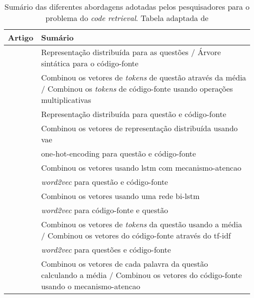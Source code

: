 \begin{table}[h]
\centering
\begin{tabular}{  p{5cm}  p{10cm}   }
\hline
\textbf{Artigo} & \textbf{Sumário} \\
\hline
\multirow{2}{8em}{\cite{Allamanis-bimodal-source-code-natural-language:2015}} & Representação distribuída para as questões / Árvore sintática para o código-fonte\\

& Combinou os vetores de \textit{tokens} de questão através da média / Combinou os \textit{tokens} de código-fonte usando operações multiplicativas\\

\hline
 
\multirow{2}{8em}{\cite{Chen-bi-variational-autoencoder:2018}} & Representação distribuída para questão e código-fonte\\

& Combinou os vetores de representação distribuída usando \acrshort{vae}\\

 \hline
\multirow{2}{8em}{\cite{iyer-etal-2016-summarizing}} & \gls{one-hot-encoding} para questão e código-fonte \\
 
 & Combinou os vetores usando \acrshort{lstm} com \gls{mecanismo-atencao}\\
 
 \hline
 
 \multirow{2}{8em}{\cite{Gu-deep-code-search:2018}} & \textit{word2vec} para questão e código-fonte\\
 
 & Combinou os vetores usando uma rede bi-\acrshort{lstm}\\
 
 \hline
 
 \multirow{2}{8em}{\citep{Sachdev-neural-code-search:2018}} & \textit{word2vec} para código-fonte e questão\\
 
 & Combinou os vetores de \textit{tokens} da questão usando a média / Combinou os vetores do código-fonte através do \acrshort{tf-idf} \\
 
 \hline
 
 \multirow{2}{8em}{\cite{cambronero-deep-learning-code-search:2019}} & \textit{word2vec} para questões e código-fonte \\
 
 & Combinou os vetores de cada palavra da questão calculando a média / Combinou os vetores do código-fonte usando o \gls{mecanismo-atencao}\\
 
 \hline
 
\end{tabular}
\caption{Sumário das diferentes abordagens adotadas pelos pesquisadores para o problema do \textit{code retrieval}. Tabela adaptada de \cite{cambronero-deep-learning-code-search:2019}}
\label{table:summary-joint-embedding}
\end{table}

